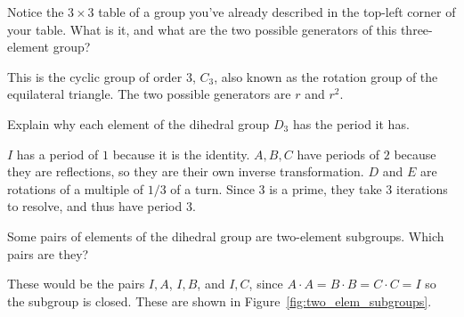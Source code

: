 \documentclass[../key.tex]{subfiles}
\begin{document}
\begin{outer_problem}
\item Notice the $3\times 3$ table of a group you've already described in the top-left corner of your table. What is it, and what are the two possible generators of this three-element group?
\end{outer_problem}

\noindent This is the cyclic group of order $3$, $C_3$, also known as the rotation group of the equilateral triangle. The two possible generators are $r$ and $r^2$.

\begin{outer_problem}
\item Explain why each element of the dihedral group $D_3$ has the period it has.
\end{outer_problem}

\noindent$I$ has a period of $1$ because it is the identity. $A,B,C$ have periods of $2$ because they are reflections, so they are their own inverse transformation. $D$ and $E$ are rotations of a multiple of $1/3$ of a turn. Since $3$ is a prime, they take $3$ iterations to resolve, and thus have period $3$.

\begin{outer_problem}
\item Some pairs of elements of the dihedral group are two-element subgroups. Which pairs are they?
\end{outer_problem}

\noindent These would be the pairs ${I,A}$, ${I,B}$, and ${I,C}$, since $A\cdot A=B\cdot B=C\cdot C = I$ so the subgroup is closed. These are shown in Figure~\ref{fig:two_elem_subgroups}.
\end{document}
